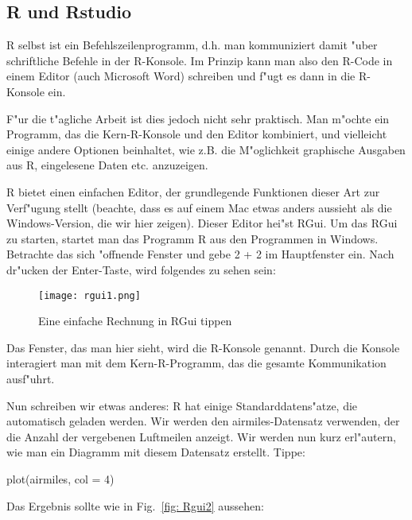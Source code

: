 \documentclass[a4paper,twoside]{tufte-book}\usepackage[]{graphicx}\usepackage[]{color}
\begin{document}
\begin{appendices}

\chapter{R und Rstudio}

R selbst ist ein Befehlszeilenprogramm, d.h. man kommuniziert damit "uber schriftliche Befehle in der R-Konsole. Im Prinzip kann man also den R-Code in einem Editor (auch Microsoft Word) schreiben und f"ugt es dann in die R-Konsole ein.

F"ur die t"agliche Arbeit ist dies jedoch nicht sehr praktisch. Man m"ochte ein Programm, das die Kern-R-Konsole und den Editor kombiniert, und vielleicht einige andere Optionen beinhaltet, wie z.B. die M"oglichkeit graphische Ausgaben aus R, eingelesene Daten etc. anzuzeigen. 


R bietet einen einfachen Editor, der grundlegende Funktionen dieser Art zur Verf"ugung stellt (beachte, dass es auf einem Mac etwas anders aussieht als die Windows-Version, die wir hier zeigen). Dieser Editor hei"st RGui. Um das RGui zu starten, startet man das Programm R aus den Programmen in Windows. Betrachte das sich "offnende Fenster und gebe 2 + 2 im Hauptfenster ein. Nach dr"ucken der Enter-Taste, wird folgendes zu sehen sein:

\begin{figure}[]
\begin{center}
\texttt{[image: rgui1.png]}
\caption{Eine einfache Rechnung in RGui tippen}
\label{fig: Rgui1}
\end{center}
\end{figure}


Das Fenster, das man hier sieht, wird die R-Konsole genannt. Durch die Konsole interagiert man mit dem Kern-R-Programm, das die gesamte Kommunikation ausf"uhrt.

Nun schreiben wir etwas anderes: R hat einige Standarddatens"atze, die automatisch geladen werden. Wir werden den airmiles-Datensatz verwenden, der die Anzahl der vergebenen Luftmeilen anzeigt. Wir werden nun kurz erl"autern, wie man ein Diagramm mit diesem Datensatz erstellt. Tippe:

\begin{Schunk}
\begin{Sinput}
plot(airmiles, col = 4)
\end{Sinput}
\end{Schunk}

Das Ergebnis sollte wie in Fig.~\ref{fig: Rgui2} aussehen:


\end{appendices}
\end{document}
